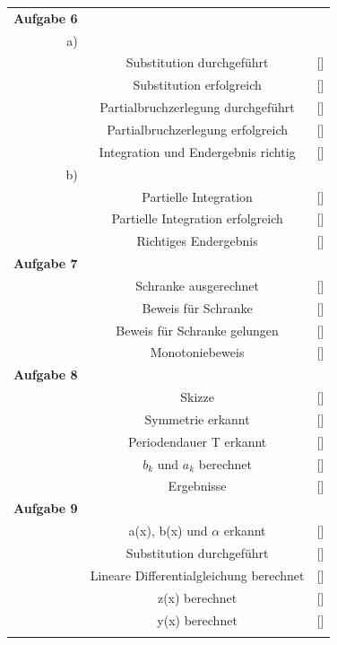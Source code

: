 \documentclass[11pt,final]{scrreprt}
\newcommand{\gbr} {\bigskip\\}
\begin{document}
\begin{tabular}{rcl}
\textbf{Aufgabe 6} &  &  \\ 
a) &  &  \\ 
 & Substitution durchgeführt & [\hspace*{0.3cm}] \\ 
 & Substitution erfolgreich & [\hspace*{0.3cm}] \\ 
 & Partialbruchzerlegung durchgeführt & [\hspace*{0.3cm}] \\ 
 & Partialbruchzerlegung erfolgreich & [\hspace*{0.3cm}] \\ 
 & Integration und Endergebnis richtig & [\hspace*{0.3cm}] \\ 
b) &  &  \\ 
 & Partielle Integration & [\hspace*{0.3cm}] \\ 
 & Partielle Integration erfolgreich & [\hspace*{0.3cm}] \\ 
 & Richtiges Endergebnis & [\hspace*{0.3cm}] \gbr
\textbf{Aufgabe 7} & \hspace*{7.5cm} &  \\ 
 & Schranke ausgerechnet & [\hspace*{0.3cm}] \\ 
 & Beweis für Schranke  & [\hspace*{0.3cm}] \\ 
 & Beweis für Schranke gelungen & [\hspace*{0.3cm}] \\ 
 & Monotoniebeweis & [\hspace*{0.3cm}] \gbr 
\textbf{Aufgabe 8} &  &  \\ 
 & Skizze & [\hspace*{0.3cm}] \\ 
 & Symmetrie erkannt & [\hspace*{0.3cm}] \\ 
 & Periodendauer T erkannt & [\hspace*{0.3cm}] \\ 
 & $b_k$ und $a_k$ berechnet & [\hspace*{0.3cm}] \\ 
 & Ergebnisse & [\hspace*{0.3cm}] \gbr 
\textbf{Aufgabe 9} &  &  \\ 
 & a(x), b(x) und $\alpha$ erkannt & [\hspace*{0.3cm}] \\ 
 & Substitution durchgeführt & [\hspace*{0.3cm}] \\ 
 & Lineare Differentialgleichung berechnet & [\hspace*{0.3cm}] \\ 
 & z(x) berechnet & [\hspace*{0.3cm}] \\ 
 & y(x) berechnet & [\hspace*{0.3cm}] \gbr 
 &  &  \\ 
\end{tabular} 
\end{document}
